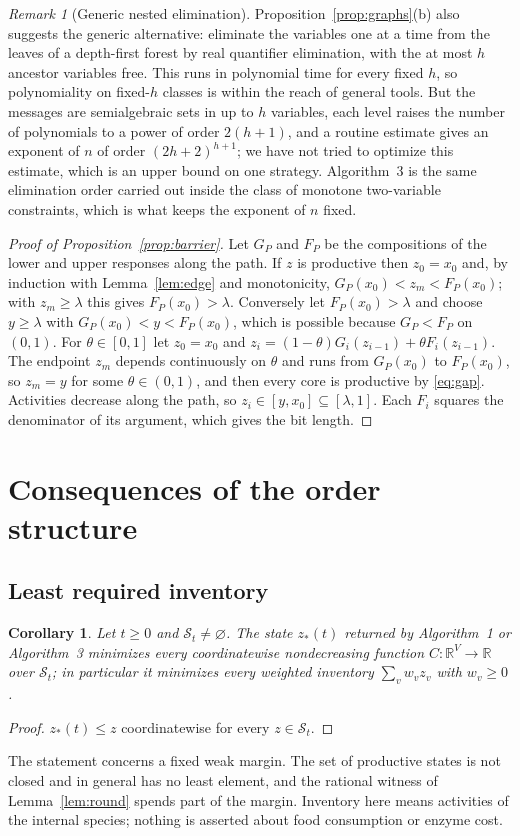 \documentclass[11pt,a4paper]{article}
\theoremstyle{plain}
\newtheorem{corollary}[theorem]{Corollary}
\theoremstyle{definition}
\theoremstyle{remark}
\newtheorem{remark}[theorem]{Remark}
\newcommand{\R}{\mathbb{R}}
\newcommand{\St}{\mathcal{S}_t}
\begin{document}
\begin{remark}[Generic nested elimination]\label{rem:nested}
Proposition~\ref{prop:graphs}(b) also suggests the generic alternative: eliminate the variables one at a time from the leaves of a depth-first forest by real quantifier elimination, with the at most $h$ ancestor variables free. This runs in polynomial time for every fixed $h$, so polynomiality on fixed-$h$ classes is within the reach of general tools. But the messages are semialgebraic sets in up to $h$ variables, each level raises the number of polynomials to a power of order $2(h+1)$, and a routine estimate gives an exponent of $n$ of order $(2h+2)^{h+1}$; we have not tried to optimize this estimate, which is an upper bound on one strategy. Algorithm~3 is the same elimination order carried out inside the class of monotone two-variable constraints, which is what keeps the exponent of $n$ fixed.
\end{remark}

\begin{proof}[Proof of Proposition~\ref{prop:barrier}]
Let $G_P$ and $F_P$ be the compositions of the lower and upper responses along the path. If $z$ is productive then $z_0=x_0$ and, by induction with Lemma~\ref{lem:edge} and monotonicity, $G_P(x_0)<z_m<F_P(x_0)$; with $z_m\ge\lambda$ this gives $F_P(x_0)>\lambda$. Conversely let $F_P(x_0)>\lambda$ and choose $y\ge\lambda$ with $G_P(x_0)<y<F_P(x_0)$, which is possible because $G_P<F_P$ on $(0,1)$. For $\theta\in[0,1]$ let $z_0=x_0$ and $z_i=(1-\theta)G_i(z_{i-1})+\theta F_i(z_{i-1})$. The endpoint $z_m$ depends continuously on $\theta$ and runs from $G_P(x_0)$ to $F_P(x_0)$, so $z_m=y$ for some $\theta\in(0,1)$, and then every core is productive by \eqref{eq:gap}. Activities decrease along the path, so $z_i\in[y,x_0]\subseteq[\lambda,1]$. Each $F_i$ squares the denominator of its argument, which gives the bit length.
\end{proof}

\section{Consequences of the order structure}\label{sec:consequences}

\subsection{Least required inventory}
\begin{corollary}\label{cor:inventory}
Let $t\ge0$ and $\St\neq\varnothing$. The state $z_*(t)$ returned by Algorithm~1 or Algorithm~3 minimizes every coordinatewise nondecreasing function $C\colon\R^V\to\R$ over $\St$; in particular it minimizes every weighted inventory $\sum_vw_vz_v$ with $w_v\ge0$.
\end{corollary}
\begin{proof}
$z_*(t)\le z$ coordinatewise for every $z\in\St$.
\end{proof}
The statement concerns a fixed weak margin. The set of productive states is not closed and in general has no least element, and the rational witness of Lemma~\ref{lem:round} spends part of the margin. Inventory here means activities of the internal species; nothing is asserted about food consumption or enzyme cost.
\end{document}
